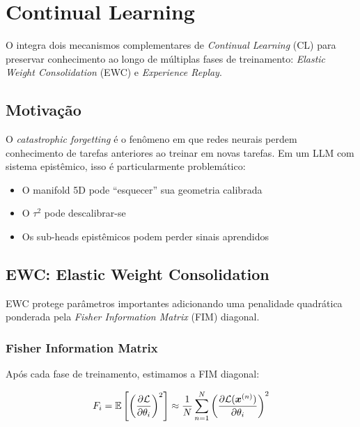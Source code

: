 
\section{Continual Learning}
\label{sec:continual}

O \aletheion{} integra dois mecanismos complementares de
\textit{Continual Learning} (CL) para preservar conhecimento ao longo
de m\'ultiplas fases de treinamento: \textit{Elastic Weight Consolidation}
(EWC) e \textit{Experience Replay}.

\subsection{Motiva\c{c}\~ao}

O \textit{catastrophic forgetting} \cite{mccloskey1989catastrophic} \'e
o fen\^omeno em que redes neurais perdem conhecimento de tarefas
anteriores ao treinar em novas tarefas. Em um LLM com sistema
epist\^emico, isso \'e particularmente problem\'atico:

\begin{itemize}
    \item O manifold 5D pode ``esquecer'' sua geometria calibrada
    \item O $\tau^2$ pode descalibrar-se
    \item Os sub-heads epist\^emicos podem perder sinais aprendidos
\end{itemize}

\subsection{EWC: Elastic Weight Consolidation}
\label{sec:ewc}

EWC \cite{kirkpatrick2017ewc} protege par\^ametros importantes adicionando
uma penalidade quadr\'atica ponderada pela \textit{Fisher Information Matrix}
(FIM) diagonal.

\subsubsection{Fisher Information Matrix}

Ap\'os cada fase de treinamento, estimamos a FIM diagonal:

\begin{equation}
    F_i = \mathbb{E}\left[\left(\frac{\partial \mathcal{L}}{\partial \theta_i}\right)^2\right]
    \approx \frac{1}{N} \sum_{n=1}^{N} \left(\frac{\partial \mathcal{L}(\bm{x}^{(n)})}{\partial \theta_i}\right)^2
    \label{eq:fisher}
\end{equation}

